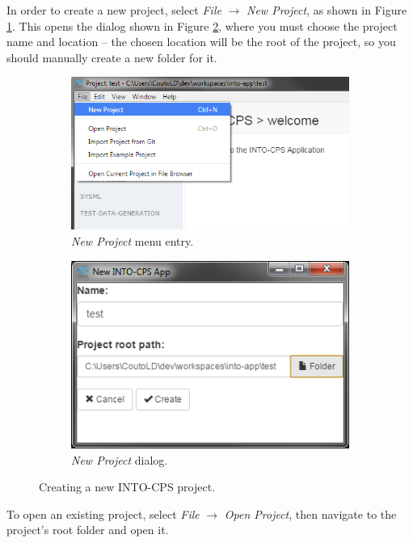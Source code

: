 %
%
%
In order to create a new project, select \textit{File} $\rightarrow$ \textit{New Project}, as shown
in Figure \ref{fig:newproj-menu}. This opens the dialog shown in
Figure \ref{fig:newproj-diag}, where you must choose the project name and location -- the chosen location will be the root of the project, so you should manually
create a new folder for it.
%
%
%
\begin{figure}
  \centering
  \begin{subfigure}[b]{0.45\textwidth}
    \includegraphics[width=\textwidth]{figures/app/newproj-menu}
    \caption{\emph{New Project} menu entry.}
    \label{fig:newproj-menu}
  \end{subfigure}
  \quad 
  \begin{subfigure}[b]{0.45\textwidth}
    \includegraphics[width=\textwidth]{figures/app/newproj-diag}
    \caption{\emph{New Project} dialog.} 
    \label{fig:newproj-diag}
  \end{subfigure}
  \caption{Creating a new INTO-CPS project.}
  \label{fig:newproj}
\end{figure}
%
%
%
To open an existing project, select \textit{File} $\rightarrow$ \textit{Open Project}, then navigate to the project's root folder and open it. 

